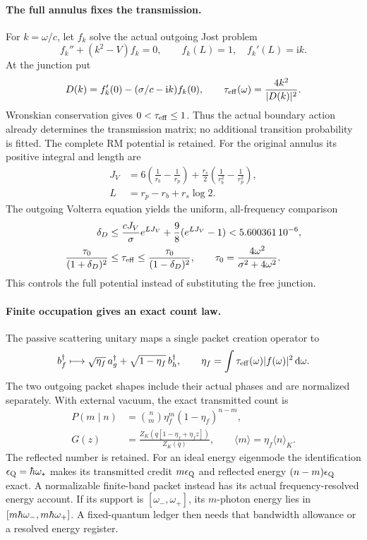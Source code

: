 \documentclass[10pt,twocolumn,letterpaper]{article}
\newcommand{\dd}{\mathrm{d}}
\renewcommand{\hbar}{\mathchar'26\mkern-9mu h}
\begin{document}
\paragraph{The full annulus fixes the transmission.}
For $k=\omega/c$, let $f_k$ solve the actual outgoing Jost problem
\[
 f_k''+(k^2-V)f_k=0,\qquad f_k(L)=1,\quad f_k'(L)=\mathrm{i}k.
\]
At the junction put
\[
 D(k)=f_k'(0)-(\sigma/c-\mathrm{i}k)f_k(0),\qquad
 \tau_{\rm eff}(\omega)=\frac{4k^2}{|D(k)|^2}.
\]
Wronskian conservation gives $0<\tau_{\rm eff}\le1$. Thus the actual
boundary action already determines the transmission matrix; no additional
transition probability is fitted. The complete RM potential is retained.
For the original annulus its positive integral and length are
\[
 \begin{split}
 J_V&=6\left(\frac1{r_b}-\frac1{r_p}\right)
       +\frac{r_s}{2}\left(\frac1{r_b^2}-\frac1{r_p^2}\right),\\
 L&=r_p-r_b+r_s\log2.
 \end{split}
\]
The outgoing Volterra equation yields the uniform, all-frequency comparison
\[
 \begin{split}
 \delta_D&\le\frac{cJ_V}{\sigma}e^{LJ_V}
                    +\frac98(e^{LJ_V}-1)
                 <5.600361\,10^{-6},\\
 \frac{\tau_0}{(1+\delta_D)^2}
 &\le\tau_{\rm eff}\le\frac{\tau_0}{(1-\delta_D)^2},\qquad
 \tau_0=\frac{4\omega^2}{\sigma^2+4\omega^2}.
 \end{split}
\]
This controls the full potential instead of substituting the free junction.

\paragraph{Finite occupation gives an exact count law.}
The passive scattering unitary maps a single packet creation operator to
\[
 b_f^\dagger\longmapsto
       \sqrt{\eta_f}\,a_g^\dagger
           +\sqrt{1-\eta_f}\,b_h^\dagger,
 \qquad \eta_f=\int\tau_{\rm eff}(\omega)|f(\omega)|^2\,\dd\omega.
\]
The two outgoing packet shapes include their actual phases and are
normalized separately. With external vacuum, the exact transmitted count is
\[
 \begin{split}
 P(m\mid n)&={n\choose m}\eta_f^m(1-\eta_f)^{n-m},\\
 G(z)&=\frac{Z_K(q[1-\eta_f+\eta_f z])}{Z_K(q)},\qquad
 \langle m\rangle=\eta_f\langle n\rangle_K.
 \end{split}
\]
The reflected number is retained. For an ideal energy eigenmode the
identification $\epsilon_{\rm Q}=\hbar\omega_*$ makes its transmitted credit
$m\epsilon_{\rm Q}$ and reflected energy $(n-m)\epsilon_{\rm Q}$ exact. A normalizable
finite-band packet instead has its actual frequency-resolved energy account.
If its support is $[\omega_-,\omega_+]$, its $m$-photon energy lies in
$[m\hbar\omega_-,m\hbar\omega_+]$. A fixed-quantum ledger then needs that
bandwidth allowance or a resolved energy register.
\end{document}
